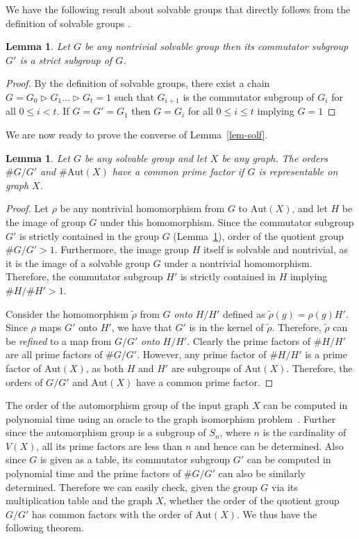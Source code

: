 \documentclass[a4paper,11pt]{article}
\newtheorem{lemma}[theorem]{Lemma}
\newcommand{\Aut}[1]{\ensuremath{\mathrm{Aut}\left(#1\right)}}
\begin{document}
We have the following result about solvable groups that directly
follows from the definition of solvable groups \cite[Page 138]{hall}.

\begin{lemma}\label{lem-nontrivial-govergprime}
  Let $G$ be any nontrivial solvable group then its commutator
  subgroup $G'$ is a strict subgroup of $G$.
\end{lemma}
\begin{proof}
  By the definition of solvable groups, there exist a chain $G = G_0
  \rhd G_1 \ldots \rhd G_t = 1$ such that $G_{i+1}$ is the commutator
  subgroup of $G_i$ for all $0 \leq i < t$. If $G=G'=G_1$ then $G=G_i$
  for all $0 \leq i \leq t$ implying $G=1$
\end{proof}

We are now ready to prove the converse of Lemma~\ref{lem-solf}.

\begin{lemma}\label{lem-solb}
  Let $G$ be any solvable group and let $X$ be any graph. The orders
  $\#G/G'$ and $\#\Aut{X}$ have a common prime factor if $G$ is
  representable on graph $X$.
\end{lemma}
\begin{proof}
  Let $\rho$ be any nontrivial homomorphism from $G$ to $\Aut{X}$, and
  let $H$ be the image of group $G$ under this homomorphism. Since the
  commutator subgroup $G'$ is strictly contained in the group $G$
  (Lemma~\ref{lem-nontrivial-govergprime}), order of the quotient
  group $\#G/G' >1$. Furthermore, the image group $H$ itself is
  solvable and nontrivial, as it is the image of a solvable group $G$
  under a nontrivial homomorphism. Therefore, the commutator subgroup
  $H'$ is strictly contained in $H$ implying $\#H/\#H'>1$.

  Consider the homomorphism $\tilde{\rho}$ from $G$ \emph{onto} $H/H'$
  defined as $\tilde{\rho}(g) = \rho(g) H'$. Since $\rho$ maps $G'$
  onto $H'$, we have that $G'$ is in the kernel of
  $\tilde{\rho}$. Therefore, $\tilde{\rho}$ can be \emph{refined} to a
  map from $G/G'$ \emph{onto} $H/H'$. Clearly the prime factors of $\#
  H/H'$ are all prime factors of $\# G/G'$. However, any prime factor
  of $\# H/H'$ is a prime factor of $\Aut{X}$, as both $H$ and $H'$
  are subgroups of $\Aut{X}$. Therefore, the orders of $G/G'$ and
  $\Aut{X}$ have a common prime factor.
\end{proof}

The order of the automorphism group of the input graph $X$ can be
computed in polynomial time using an oracle to the graph isomorphism
problem~\cite{mathon79note}. Further since the automorphism group is a
subgroup of $S_n$, where $n$ is the cardinality of $V(X)$, all its
prime factors are less than $n$ and hence can be determined. Also
since $G$ is given as a table, its commutator subgroup $G'$ can be
computed in polynomial time and the prime factors of $\# G/G'$ can
also be similarly determined.  Therefore we can easily check, given
the group $G$ via its multiplication table and the graph $X$, whether
the order of the quotient group $G/G'$ has common factors with the
order of $\Aut{X}$. We thus have the following theorem.
\end{document}
